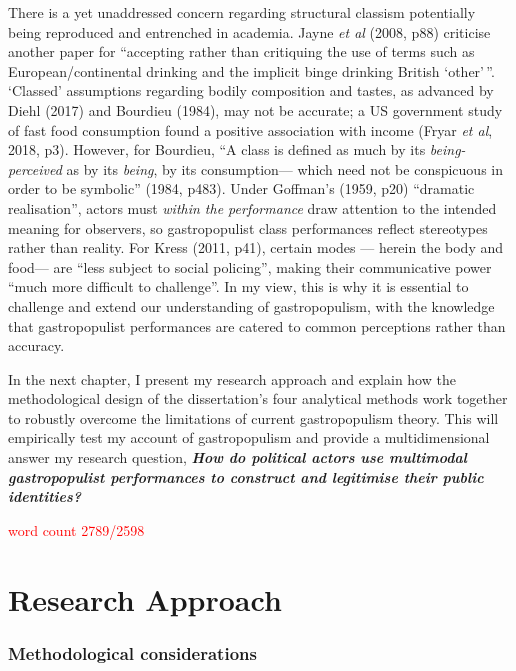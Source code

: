 \documentclass[a4paper, nobind]{templates/ociamthesis}
\begin{document}
There is a yet unaddressed concern regarding structural classism potentially being reproduced and entrenched in academia. Jayne \emph{et al} (2008, p88) criticise another paper for ``accepting rather than critiquing the use of terms such as European/continental drinking and the implicit binge drinking British `other'\,''. `Classed' assumptions regarding bodily composition and tastes, as advanced by Diehl (2017) and Bourdieu (1984), may not be accurate; a US government study of fast food consumption found a positive association with income (Fryar \emph{et al}, 2018, p3). However, for Bourdieu, ``A class is defined as much by its \emph{being-perceived} as by its \emph{being}, by its consumption--- which need not be conspicuous in order to be symbolic'' (1984, p483). Under Goffman's (1959, p20) ``dramatic realisation'', actors must \emph{within the performance} draw attention to the intended meaning for observers, so gastropopulist class performances reflect stereotypes rather than reality. For Kress (2011, p41), certain modes --- herein the body and food--- are ``less subject to social policing'', making their communicative power ``much more difficult to challenge''. In my view, this is why it is essential to challenge and extend our understanding of gastropopulism, with the knowledge that gastropopulist performances are catered to common perceptions rather than accuracy.

In the next chapter, I present my research approach and explain how the methodological design of the dissertation's four analytical methods work together to robustly overcome the limitations of current gastropopulism theory. This will empirically test my account of gastropopulism and provide a multidimensional answer my research question, \textbf{\emph{How do political actors use multimodal gastropopulist performances to construct and legitimise their public identities?}}

\textcolor{red}{word count 2789/2598}

\hypertarget{research-approach}{%
\chapter{Research Approach}\label{research-approach}}

\hypertarget{methodological-considerations}{%
\subsection*{Methodological considerations}\label{methodological-considerations}}
\end{document}
